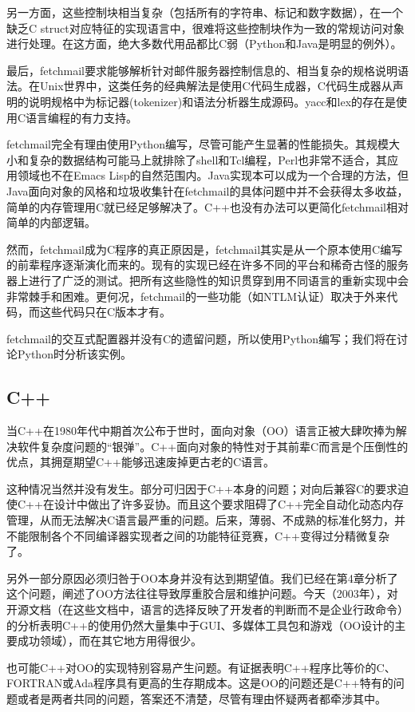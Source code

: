 \documentclass[12pt,oneside]{book}
\begin{document}
\begin{common-format}
另一方面，这些控制块相当复杂（包括所有的字符串、标记和数字数据），在一个缺乏C struct对应特征的实现语言中，很难将这些控制块作为一致的常规访问对象进行处理。在这方面，绝大多数代用品都比C弱（Python和Java是明显的例外）。

最后，fetchmail要求能够解析针对邮件服务器控制信息的、相当复杂的规格说明语法。在Unix世界中，这类任务的经典解法是使用C代码生成器，C代码生成器从声明的说明规格中为标记器(tokenizer)和语法分析器生成源码。yacc和lex的存在是使用C语言编程的有力支持。

fetchmail完全有理由使用Python编写，尽管可能产生显著的性能损失。其规模大小和复杂的数据结构可能马上就排除了shell和Tcl编程，Perl也非常不适合，其应用领域也不在Emacs Lisp的自然范围内。Java实现本可以成为一个合理的方法，但Java面向对象的风格和垃圾收集针在fetchmail的具体问题中并不会获得太多收益，简单的内存管理用C就已经足够解决了。C++也没有办法可以更简化fetchmail相对简单的内部逻辑。

然而，fetchmail成为C程序的真正原因是，fetchmail其实是从一个原本使用C编写的前辈程序逐渐演化而来的。现有的实现已经在许多不同的平台和稀奇古怪的服务器上进行了广泛的测试。把所有这些隐性的知识贯穿到用不同语言的重新实现中会非常棘手和困难。更何况，fetchmail的一些功能（如NTLM认证）取决于外来代码，而这些代码只在C版本才有。

fetchmail的交互式配置器并没有C的遗留问题，所以使用Python编写；我们将在讨论Python时分析该实例。

\subsection{C++}
当C++在1980年代中期首次公布于世时，面向对象（OO）语言正被大肆吹捧为解决软件复杂度问题的“银弹”。C++面向对象的特性对于其前辈C而言是个压倒性的优点，其拥趸期望C++能够迅速废掉更古老的C语言。

这种情况当然并没有发生。部分可归因于C++本身的问题；对向后兼容C的要求迫使C++在设计中做出了许多妥协。而且这个要求阻碍了C++完全自动化动态内存管理，从而无法解决C语言最严重的问题。后来，薄弱、不成熟的标准化努力，并不能限制各个不同编译器实现者之间的功能特征竞赛，C++变得过分精微复杂了。

另外一部分原因必须归咎于OO本身并没有达到期望值。我们已经在第4章分析了这个问题，阐述了OO方法往往导致厚重胶合层和维护问题。今天（2003年），对开源文档（在这些文档中，语言的选择反映了开发者的判断而不是企业行政命令）的分析表明C++的使用仍然大量集中于GUI、多媒体工具包和游戏（OO设计的主要成功领域），而在其它地方用得很少。

也可能C++对OO的实现特别容易产生问题。有证据表明C++程序比等价的C、FORTRAN或Ada程序具有更高的生存期成本。这是OO的问题还是C++特有的问题或者是两者共同的问题，答案还不清楚，尽管有理由怀疑两者都牵涉其中\cite{Hatton98}。


\end{common-format}
\end{document}
